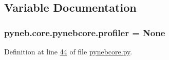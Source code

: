 \subsection{Variable Documentation}
\hypertarget{namespacepyneb_1_1core_1_1pynebcore_ab9e20b2acbbf8eec3da84081929fae24}{
\subsubsection[{profiler}]{\setlength{\rightskip}{0pt plus 5cm}pyneb.\-core.\-pynebcore.\-profiler = None}}\label{namespacepyneb_1_1core_1_1pynebcore_ab9e20b2acbbf8eec3da84081929fae24}


Definition at line \hyperlink{pynebcore_8py_source_l00044}{44} of file \hyperlink{pynebcore_8py_source}{pynebcore.\-py}.

